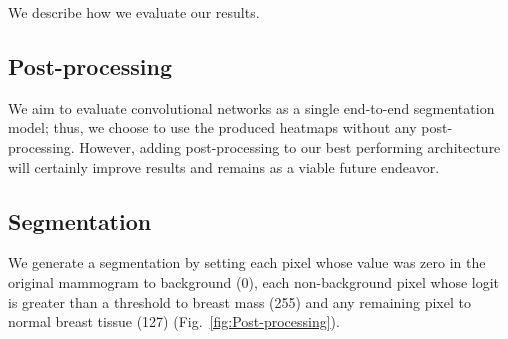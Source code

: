 We describe how we evaluate our results.

\subsection{Post-processing}
We aim to evaluate convolutional networks as a single end-to-end segmentation model;
thus, we choose to use the produced heatmaps without any post-processing. However, adding post-processing to our best performing architecture will certainly improve results and remains as a viable future endeavor.%


\subsection{Segmentation}
We generate a segmentation by setting each pixel whose value was zero in the original mammogram to background (0), each non-background pixel whose logit is greater than a threshold to breast mass (255) and any remaining pixel to normal breast tissue (127) (Fig.~\ref{fig:Post-processing}).

